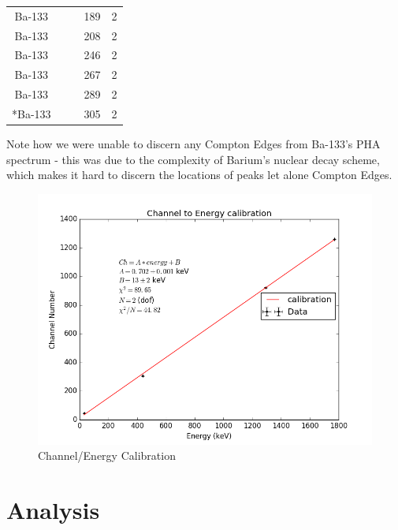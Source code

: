 \documentclass{article}
\begin{document}
\begin{table}[]
\begin{tabular}{|c|c|c|c|c|}
Ba-133 &                      &             & 189              & 2           \\ 
Ba-133 &                      &             & 208              & 2           \\
Ba-133 &                      &             & 246              & 2           \\ 
Ba-133 &                      &             & 267              & 2           \\
Ba-133 &                      &             & 289              & 2           \\ 
*Ba-133 &                      &             & 305              & 2           \\ \hline
\end{tabular}
\end{table}

Note how we were unable to discern any Compton Edges from Ba-133's PHA spectrum - this was due to the complexity of Barium's nuclear decay scheme, which makes it hard to discern the locations of peaks let alone Compton Edges.

\begin{figure}[!htb]
	\centering
	\includegraphics[scale=0.75]{plots/calibration.png}
  	\caption{Channel/Energy Calibration} 
 	\label{calibration}
\end{figure}

\clearpage
\newpage
\section{Analysis}
\end{document}

